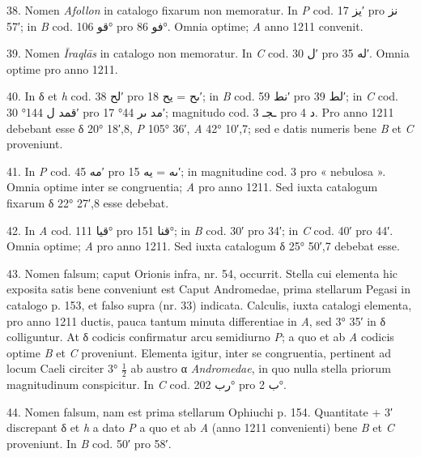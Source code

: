 \documentclass[11pt]{article}
\begin{document}
{\small
\par\hangindent=12mm 38. Nomen \textit{Afollon} in catalogo fixarum non memoratur. In \textit{P} cod. \textarabic{يز} 17′ pro \textarabic{نز} 57′; in \textit{B} cod. \textarabic{قو} 106° pro \textarabic{فو} 86°. Omnia optime; \textit{A} anno 1211 convenit.
\par\hangindent=12mm 39. Nomen \textit{Īraqlās} in catalogo non memoratur. In \textit{C} cod. \textarabic{ل} 30′ pro \textarabic{له} 35′. Omnia optime pro anno 1211.
\par\hangindent=12mm 40. In δ et \textit{h} cod. \textarabic{لح} 38′ pro \textarabic{ىح} = \textarabic{يح} 18′; in \textit{B} cod. \textarabic{نط} 59′ pro \textarabic{لط} 39′; in \textit{C} cod. \textarabic{قمد ل} 144° 30′ pro \textarabic{مد ىر} 44° 17′; magnitudo cod. \textarabic{ـجـ} 3 pro \textarabic{د} 4. Pro anno 1211 debebant esse δ 20° 18′,8, \textit{P} 105° 36′, \textit{A} 42° 10′,7; sed e datis numeris bene \textit{B} et \textit{C} proveniunt.
\par\hangindent=12mm 41. In \textit{P} cod. \textarabic{مه} 45′ pro \textarabic{ىه} = \textarabic{يه} 15′; in magnitudine cod. 3 pro « nebulosa ». Omnia optime inter se congruentia; \textit{A} pro anno 1211. Sed iuxta catalogum fixarum δ 22° 27′,8 esse debebat.
\par\hangindent=12mm 42. In \textit{A} cod. \textarabic{قيا} 111° pro \textarabic{قنا} 151°; in \textit{B} cod. 30′ pro 34′; in \textit{C} cod. 40′ pro 44′. Omnia optime; \textit{A} pro anno 1211. Sed iuxta catalogum δ 25° 50′,7 debebat esse.
\par\hangindent=12mm 43. Nomen falsum; caput Orionis infra, nr. 54, occurrit. Stella cui elementa hic exposita satis bene conveniunt est Caput Andromedae, prima stellarum Pegasi in catalogo p. 153, et falso supra (nr. 33) indicata. Calculis, iuxta catalogi elementa, pro anno 1211 ductis, pauca tantum minuta differentiae in \textit{A}, sed 3° 35′ in δ colliguntur. At δ codicis confirmatur arcu semidiurno \textit{P}; a quo et ab \textit{A} codicis optime \textit{B} et \textit{C} proveniunt. Elementa igitur, inter se congruentia, pertinent ad locum Caeli circiter 3° $\tfrac{1}{2}$ ab austro α \textit{Andromedae}, in quo nulla stella priorum magnitudinum conspicitur. In \textit{C} cod. \textarabic{رب} 202° pro \textarabic{ب} 2°.
\par\hangindent=12mm 44. Nomen falsum, nam est prima stellarum Ophiuchi p. 154. Quantitate + 3′ discrepant δ et \textit{h} a dato \textit{P} a quo et ab \textit{A} (anno 1211 convenienti) bene \textit{B} et \textit{C} proveniunt. In \textit{B} cod. 50′ pro 58′.
\par}
\end{document}
